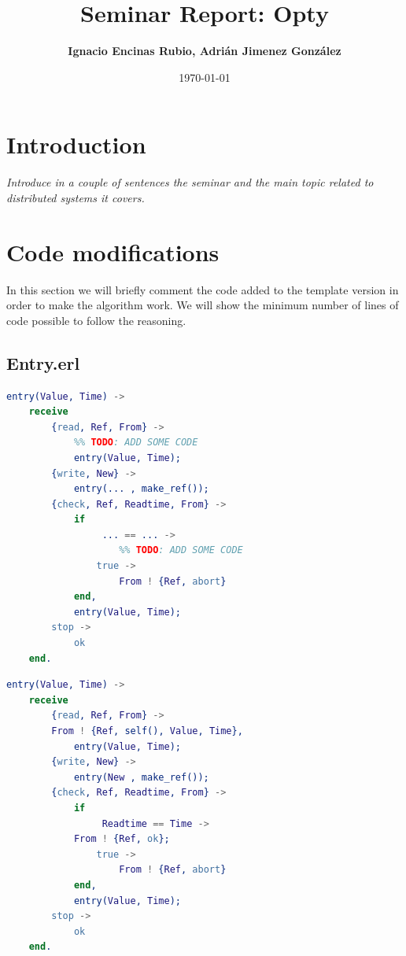 \documentclass[a4paper, 10pt]{article}
\title{Seminar Report: Opty}
\author{\textbf{Ignacio Encinas Rubio, Adrián Jimenez González}}
\date{\normalsize\today{}}
\begin{document}
\maketitle

  
  

\section{Introduction}


\textit{Introduce in a couple of sentences the seminar and the main topic related to distributed systems it covers.}

\section{Code modifications}

   In this section we will briefly comment the code added to the template version in order to
   make the algorithm work. We will show the minimum number of lines of code possible to follow the reasoning.

  \subsection{Entry.erl}

    \begin{minipage}{.45\textwidth}
	\begin{lstlisting}[language=erlang, caption={Template}]
entry(Value, Time) ->
    receive
        {read, Ref, From} ->
            %% TODO: ADD SOME CODE
            entry(Value, Time);
        {write, New} ->
            entry(... , make_ref()); 
        {check, Ref, Readtime, From} ->
            if 
                 ... == ... ->  
                    %% TODO: ADD SOME CODE
                true ->
                    From ! {Ref, abort}
            end,
            entry(Value, Time);
        stop ->
            ok
    end.
 	\end{lstlisting}
    \end{minipage}\hfill
    \begin{minipage}{.45\textwidth}
	\begin{lstlisting}[language=erlang, caption={Filled version}]
entry(Value, Time) ->
    receive
        {read, Ref, From} ->
	    From ! {Ref, self(), Value, Time},
            entry(Value, Time);
        {write, New} ->
            entry(New , make_ref());
        {check, Ref, Readtime, From} ->
            if 
                 Readtime == Time -> 
		    From ! {Ref, ok};
                true ->
                    From ! {Ref, abort}
            end,
            entry(Value, Time);
        stop ->
            ok
    end.
  	\end{lstlisting}
  \end{minipage}
\end{document}
